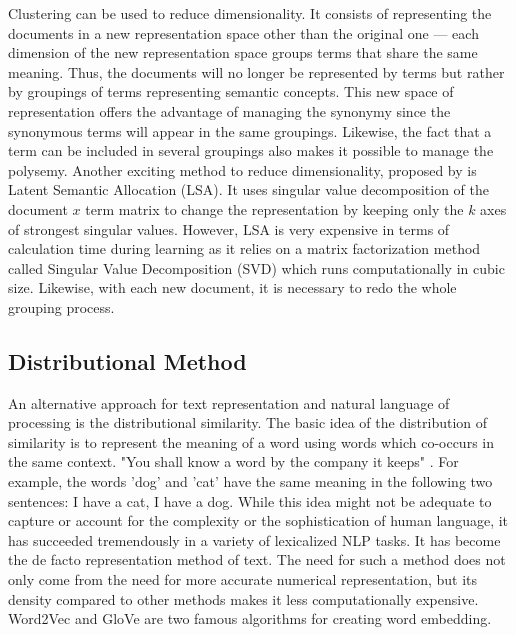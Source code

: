 
Clustering \citep{baker1998distributional} \citep{sable2001using} \citep{slonim2001power} can be used to reduce dimensionality. It consists of representing the documents in a new representation space other than the original one — each dimension of the new representation space groups terms that share the same meaning. Thus, the documents will no longer be represented by terms but rather by groupings of terms representing semantic concepts. This new space of representation offers the advantage of managing the synonymy since the synonymous terms will appear in the same groupings. Likewise, the fact that a term can be included in several groupings also makes it possible to manage the polysemy. Another exciting method to reduce dimensionality, proposed by \citep{deerwester1990indexing} is Latent Semantic Allocation (LSA). It uses singular value decomposition of the document $x$ term matrix to change the representation by keeping only the $k$ axes of strongest singular values. However, LSA is very expensive in terms of calculation time during learning as it relies on a matrix factorization method called Singular Value Decomposition (SVD) which runs computationally in cubic size. Likewise, with each new document, it is necessary to redo the whole grouping process.

\subsection{Distributional Method}
An alternative approach for text representation and natural language of processing is the distributional similarity. The basic idea of the distribution of similarity is to represent the meaning of a word using words which co-occurs in the same context. "You shall know a word by the company it keeps" \citep{firth1957synopsis}. For example, the words 'dog' and 'cat' have the same meaning in the following two sentences: I have a cat, I have a dog. While this idea might not be adequate to capture or account for the complexity or the sophistication of human language, it has succeeded tremendously in a variety of lexicalized NLP tasks. It has become the de facto representation method of text. The need for such a method does not only come from the need for more accurate numerical representation, but its density compared to other methods makes it less computationally expensive. Word2Vec \citep{mikolov2013distributed} and GloVe \citep{pennington2014glove} are two famous algorithms for creating word embedding. 

